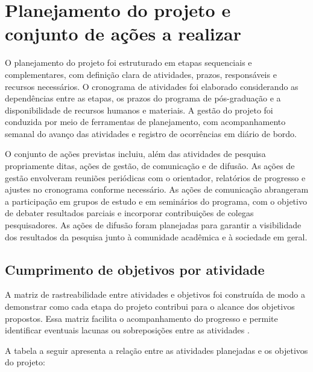 \section{Planejamento do projeto e conjunto de ações a realizar}
\label{sec:planejamento_acoes}

O planejamento do projeto foi estruturado em etapas sequenciais e complementares, com definição clara de atividades, prazos, responsáveis e recursos necessários. O cronograma de atividades foi elaborado considerando as dependências entre as etapas, os prazos do programa de pós-graduação e a disponibilidade de recursos humanos e materiais. A gestão do projeto foi conduzida por meio de ferramentas de planejamento, com acompanhamento semanal do avanço das atividades e registro de ocorrências em diário de bordo.

O conjunto de ações previstas incluiu, além das atividades de pesquisa propriamente ditas, ações de gestão, de comunicação e de difusão. As ações de gestão envolveram reuniões periódicas com o orientador, relatórios de progresso e ajustes no cronograma conforme necessário. As ações de comunicação abrangeram a participação em grupos de estudo e em seminários do programa, com o objetivo de debater resultados parciais e incorporar contribuições de colegas pesquisadores. As ações de difusão foram planejadas para garantir a visibilidade dos resultados da pesquisa junto à comunidade acadêmica e à sociedade em geral.

\subsection{Cumprimento de objetivos por atividade}
\label{subsec:cumprimento_objetivos}

A matriz de rastreabilidade entre atividades e objetivos foi construída de modo a demonstrar como cada etapa do projeto contribui para o alcance dos objetivos propostos. Essa matriz facilita o acompanhamento do progresso e permite identificar eventuais lacunas ou sobreposições entre as atividades \cite{CRESWELL2018}.

A tabela a seguir apresenta a relação entre as atividades planejadas e os objetivos do projeto:

